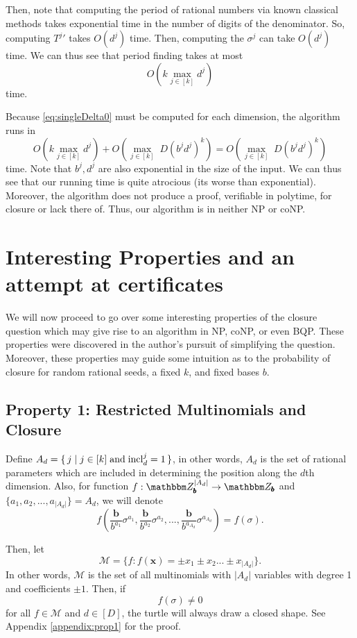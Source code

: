 \documentclass[11pt,titlepage]{article}
\newcommand{\rationalPeriod}{{T^j}'}
\newcommand{\inclIndic}[2]{{\mathrm{incl}_{#1}^{#2}}}
\newcommand{\digSumPeriodic}{\sigma^j}
\newcommand{\digSumPeriodicNoJ}{{\sigma}}
\newcommand{\commonBase}{{\pmb{b}}}
\newcommand{\numbToCommonNoJ}[1]{\frac{\commonBase}{b^{#1}}}
\begin{document}
Then, note that computing the period of rational numbers via known classical methods takes 
exponential time in the number of digits of the denominator. So, computing
$\rationalPeriod$ takes $O(d^j)$ time. Then, computing the $\digSumPeriodic$
can take $O(d^j)$ time. 
We can thus see that period finding takes at most
$$
O\left(k \max_{j \in [k]} d^j \right)
$$
time.

Because \eqref{eq:singleDelta0} must be computed for each dimension, the algorithm
runs in 
$$
  O\left(k \max_{j \in [k]} d^j \right) + 
  O\left(\max_{j \in [k]} \; D (b^j d^j)^k \right) = 
  O\left(\max_{j \in [k]} \; D (b^j d^j)^k \right)
$$
time.
Note that $b^j, d^j$ are also exponential in the size of the input. 
We can thus see that our running time is quite atrocious (its worse than exponential).
Moreover, the algorithm does not produce a proof, verifiable in polytime, for closure 
or lack there of. Thus, our algorithm is in neither NP or coNP.

\section{Interesting Properties and an attempt at certificates}
We will now proceed to go over some interesting properties of the closure question
which may give rise to an algorithm in NP, coNP, or even BQP. These properties were discovered
in the author's pursuit of simplifying the question. Moreover, these properties may guide
some intuition as to the probability of closure for random rational seeds, a fixed $k$, 
and fixed bases $b$.

\subsection{Property 1: Restricted Multinomials and Closure}
\label{prop:1}
Define $A_d = \set{j \mid j \in [k] \; \text{and}\; \inclIndic{d}{j} = 1}$, in other words,
$A_d$ is the set of rational parameters which are included in determining the position along the $d$th dimension.
Also, for function $f: \Z_\commonBase^{|A_d|} \rightarrow \Z_\commonBase$ and $\{a_1, a_2, ..., a_{|A_d|} \} = A_d$, we will denote
$$
  f\left(\numbToCommonNoJ{a_1} \digSumPeriodicNoJ^{a_1}, \numbToCommonNoJ{a_2}\digSumPeriodicNoJ^{a_2}, ..., \numbToCommonNoJ{a_{A_d}}\digSumPeriodicNoJ^{a_{A_d}}\right)
  = f\left(\digSumPeriodicNoJ\right).
$$

Then, let
$$
\mathcal{M} = \{f : f(\pmb{x}) = \pm x_1 \pm x_2 ... \pm x_{|A_d|}\}.
$$
In other words, $\mathcal{M}$ is the set of all multinomials with $|A_d|$ variables with
degree 1 and coefficients $\pm1$.
Then,
if \begin{equation}
\label{eq:satisfy-multi}
f\left(\digSumPeriodicNoJ\right) \neq 0
\end{equation}
for all $f \in \mathcal{M}$ and $d \in [D]$, the turtle will always draw a closed shape. See 
Appendix \ref{appendix:prop1} for the proof.
\end{document}
